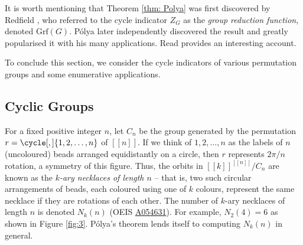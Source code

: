 \documentclass[a4paper,11pt]{article}
\numberwithin{equation}{section}
\def\llbracket{[\![}
\def\rrbracket{]\!]}
\begin{document}
    It is worth mentioning that Theorem \ref{thm: Polya} was first discovered by Redfield \cite{redfield}, who referred to the cycle indicator $Z_G$ as the \textit{group reduction function}, denoted $\text{Grf}(G)$. Pólya later independently discovered the result and greatly popularised it with his many applications. Read \cite[p.~118]{PolyaTranslation1987} provides an interesting account. \smallskip
    
    To conclude this section, we consider the cycle indicators of various permutation groups and some enumerative applications.

    \subsection{Cyclic Groups} 
    
    For a fixed positive integer $n$, let $C_{n}$ be the group generated by the permutation $r = \cycle[,]{1,2,\dots, n}$ of $\llbracket n \rrbracket$. If we think of $1, 2,\dots, n$ as the labels of $n$ (uncoloured) beads arranged equidistantly on a circle, then $r$ represents \(2\pi/n\) rotation, a symmetry of this figure. Thus, the orbits in \({\llbracket k \rrbracket}^{\llbracket n \rrbracket}/ C_{n} \) are known as the \textit{$k$-ary necklaces of length $n$} -- that is, two such circular arrangements of beads, each coloured using one of \(k\) colours, represent the same necklace if they are rotations of each other. The number of $k$-ary necklaces of length $n$ is denoted $N_k(n)$ (OEIS \href{https://oeis.org/A054631}{A054631}). For example, $N_2(4) = 6$ as shown in Figure \ref{fig:3}. Pólya's theorem lends itself to computing $N_k(n)$ in general.
\end{document}
